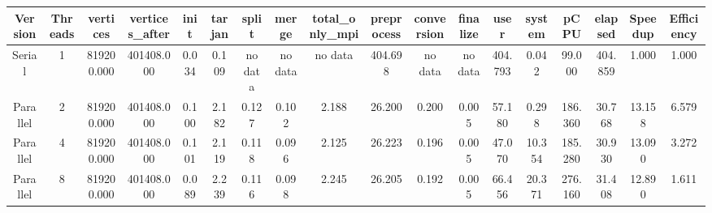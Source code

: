 \begin{tabular}{|c|c|c|c|c|c|c|c|c|c|c|c|c|c|c|c|c|c|}
\toprule
 Version &  Threads &   vertices &  vertices\_after &  init &  tarjan &   split &   merge & total\_only\_mpi &  preprocess & conversion & finalize &    user &  system &    pCPU &  elapsed &  Speedup &  Efficiency \\
\midrule
  Serial &        1 & 819200.000 &      401408.000 & 0.034 &   0.109 & no data & no data &        no data &     404.698 &    no data &  no data & 404.793 &   0.042 &  99.000 &  404.859 &    1.000 &       1.000 \\
Parallel &        2 & 819200.000 &      401408.000 & 0.100 &   2.182 &   0.127 &   0.102 &          2.188 &      26.200 &      0.200 &    0.005 &  57.180 &   0.298 & 186.360 &   30.768 &   13.158 &       6.579 \\
Parallel &        4 & 819200.000 &      401408.000 & 0.101 &   2.119 &   0.118 &   0.096 &          2.125 &      26.223 &      0.196 &    0.005 &  47.070 &  10.354 & 185.280 &   30.930 &   13.090 &       3.272 \\
Parallel &        8 & 819200.000 &      401408.000 & 0.089 &   2.239 &   0.116 &   0.098 &          2.245 &      26.205 &      0.192 &    0.005 &  66.456 &  20.371 & 276.160 &   31.408 &   12.890 &       1.611 \\
\bottomrule
\end{tabular}
